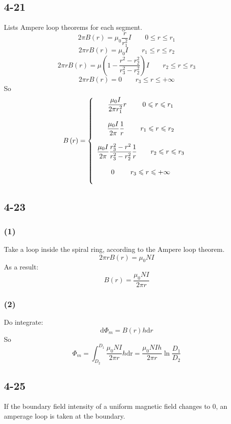 \documentclass[a4paper,11pt]{amsart}
\theoremstyle{definition}
\begin{document}
	\subsection*{4-21}
	Lists Ampere loop theorems for each segment.
	$$
	2\pi B(r)=\mu_0\dfrac{r}{r_1^2}I\qquad0\leqslant r\leqslant r_1
	$$	
	$$
	2\pi rB\left( r \right) =\mu _0I\qquad r_1\leqslant r\leqslant r_2
	$$
	$$
	2\pi rB\left( r \right) =\mu \left( 1-\frac{r^2-r_{2}^{2}}{r_{3}^{2}-r_{2}^{2}} \right) I\qquad r_2\leqslant r\leqslant r_3
	$$
	$$
	2\pi rB\left( r \right) =0\qquad r_3\leqslant r\leqslant +\infty 
	$$
	So
	$$
	B\left( r \right) =\left\{ \begin{array}{c}
		\dfrac{\mu _0I}{2\pi r_{1}^{2}}r\qquad \,\,        0\leqslant r\leqslant r_1\\\\
		\dfrac{\mu _0I}{2\pi}\dfrac{1}{r}\qquad \,\,         r_1\leqslant r\leqslant r_2\\\\
		\dfrac{\mu _0I}{2\pi}\dfrac{r_{3}^{2}-r^2}{r_{3}^{2}-r_{2}^{2}}\dfrac{1}{r}\qquad r_2\leqslant r\leqslant r_3\\\\
		0\qquad \,\,                    r_3\leqslant r\leqslant +\infty\\\\
	\end{array} \right. 
	\\	
	$$
	\subsection*{4-23}
	\subsubsection*{(1)}
	Take a loop inside the spiral ring, according to the Ampere loop theorem.
	$$
	2\pi rB\left( r \right) =\mu _0NI
	$$
	As a result:
	$$
	B\left( r \right) =\frac{\mu _0NI}{2\pi r}
	$$
	\subsubsection*{(2)}
	Do integrate:
	$$
	\mathrm{d}\varPhi _m=B\left( r \right) h\mathrm{d}r
	$$
	So
	$$
	\varPhi _m=\int_{D_2}^{D_1}{\frac{\mu _0NI}{2\pi r}h\mathrm{dr}}=\frac{\mu _0NIh}{2\pi r}\ln \frac{D_1}{D_2}
	$$
	\subsection*{4-25}
	If the boundary field intensity of a uniform magnetic field changes to 0, an amperage loop is taken at the boundary.
\end{document}
